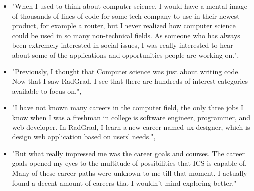 \documentclass[acmsmall]{acmart}
\begin{document}
\begin{itemize}[leftmargin=*]
\item "When I used to think about computer science, I would have a mental image of thousands of lines of code for some tech company to use in their newest product, for example a router, but I never realized how computer science could be used in so many non-technical fields. As someone who has always been extremely interested in social issues, I was really interested to hear about some of the applications and opportunities people are working on.",
\item "Previously, I thought that Computer science was just about writing code. Now that I saw RadGrad, I see that there are hundreds of interest categories available to focus on.",
\item "I have not known many careers in the computer field, the only three jobs I know when I was a freshman in college is software engineer, programmer, and web developer. In RadGrad, I learn a new career named ux designer, which is design web application based on users’ needs.",
\item "But what really impressed me was the career goals and courses. The career goals opened my eyes to the multitude of possibilities that ICS is capable of. Many of these career paths were unknown to me till that moment. I actually found a decent amount of careers that I wouldn’t mind exploring better."
\end{itemize}
\end{document}
